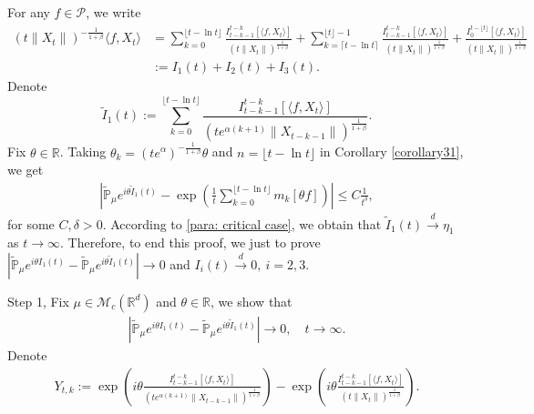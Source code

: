 \documentclass[12pt,oneside,english]{amsart}
\theoremstyle{plain}
\theoremstyle{definition}
\numberwithin{equation}{section}
\begin{document}
    For any $f\in\mathcal{P}$, we write
    \begin{align*}
        (t\|X_t\|)^{-\frac{1}{1+\beta}}\langle f,X_t\rangle&=\sum_{k=0}^{\lfloor t-\ln t \rfloor} \frac{I_{t-k-1}^{t-k}[\langle f ,X_t\rangle]}{(t\|X_t\|)^{\frac{1}{1+\beta}}}+\sum_{k=\lceil t-\ln t \rceil}^{\lfloor t \rfloor-1} \frac{I_{t-k-1}^{t-k}[\langle f ,X_t\rangle]}{(t\|X_t\|)^{\frac{1}{1+\beta}}}+\frac{I_0^{t-\lfloor t \rfloor}[\langle f ,X_t\rangle]}{(t\|X_t\|)^{\frac{1}{1+\beta}}}\\
        &:=I_1(t)+I_2(t)+I_3(t).
    \end{align*}
    Denote
    $$\tilde{I}_1(t):=\sum_{k=0}^{\lfloor t-\ln t \rfloor}\frac{I_{t-k-1}^{t-k}[\langle f ,X_t\rangle]}{(t e^{\alpha(k+1)}\|X_{t-k-1}\|)^{\frac{1}{1+\beta}}}.$$
    Fix $\theta\in \mathbb{R}$. Taking $\theta_k=(t e^{\alpha})^{-\frac{1}{1+\beta}} \theta $ and $n={\lfloor t-\ln t \rfloor}$ in Corollary \ref{corollary31}, we get
    \begin{align*}
        \left|\mathbb{\tilde{P}}_{\mu}e^{i\theta\tilde{I}_1(t)}-\exp\left(\frac{1}{t}\sum_{k=0}^{\lfloor t-\ln t \rfloor}m_k[\theta f]\right)\right|\leq C \frac{1}{t^{\delta}},
    \end{align*}
    for some $C,\delta>0$. According to \eqref{para: critical case}, we obtain that $\tilde{I}_1(t)\xrightarrow{d}\eta_1$ as $t\rightarrow \infty$.
    Therefore, to end this proof, we just to prove $\left|\mathbb{\tilde{P}}_{\mu}e^{i\theta I_1(t)}-\mathbb{\tilde{P}}_{\mu}e^{i\theta\tilde{I}_1(t)}\right|\rightarrow 0$ and $I_i(t)\xrightarrow{d} 0,~i=2,3$.
    
    Step 1, Fix $\mu\in \mathcal{M}_c(\mathbb{R}^d)$ and $\theta\in \mathbb R$, we show that
    \begin{align}
        \left|\mathbb{\tilde{P}}_{\mu}e^{i\theta I_1(t)}-\mathbb{\tilde{P}}_{\mu}e^{i\theta\tilde{I}_1(t)}\right|\rightarrow 0,\quad t\rightarrow \infty.
    \end{align}
    Denote
    \begin{align*}
        Y_{t,k}:=\exp\left(i\theta\frac{I_{t-k-1}^{t-k}[\langle f ,X_t\rangle]}{(t e^{\alpha(k+1)}\|X_{t-k-1}\|)^{\frac{1}{1+\beta}}}\right)-\exp\left(i\theta\frac{I_{t-k-1}^{t-k}[\langle f ,X_t\rangle]}{\left(t\|X_t\|\right)^{\frac{1}{1+\beta}}}\right).
    \end{align*}
\end{document}
